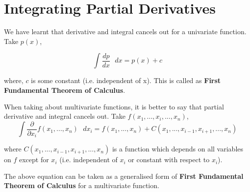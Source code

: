 \documentclass[12pt]{article}
\begin{document}
\section{Integrating Partial Derivatives}

We have learnt that derivative and integral cancels out for a univariate function. Take $p(x)$,

\begin{equation*}
    \int \frac{dp}{dx} \text{ } dx = p(x) + c
\end{equation*} \vspace{-.2cm}

where, $c$ is some constant (i.e. independent of x). This is called as \textbf{First Fundamental Theorem of Calculus}. \vspace{2cm}

When taking about multivariate functions, it is better to say that partial derivative and integral cancels out. Take $f(x_1, ..., x_i, ..., x_n)$,
\begin{equation*}
    \int \frac{\partial}{\partial x_i} f(x_1, ..., x_n) \text{ } dx_i = f(x_1, ..., x_n) + C(x_1, ..., x_{i-1}, x_{i+1}, ..., x_n)
\end{equation*}

where $C(x_1, ..., x_{i-1}, x_{i+1}, ..., x_n)$ is a function which depends on all variables on $f$ except for $x_i$ (i.e. independent of $x_i$ or constant with respect to $x_i$). \vspace{.2cm}

The above equation can be taken as a generalised form of \textbf{First Fundamental Theorem of Calculus} for a multivariate function.
\end{document}

